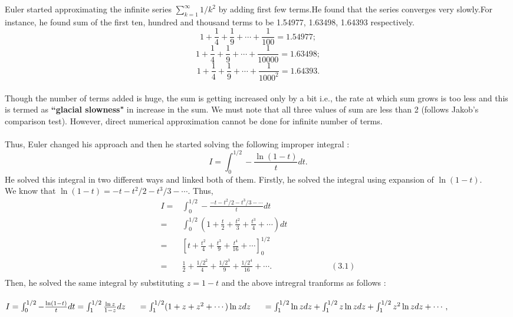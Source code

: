 \documentclass[a4paper,reqno,11pt]{amsart}
\theoremstyle{plain}%
\begin{document}
Euler started approximating the infinite series $\sum_{k=1}^{\infty}1/k^2$
by adding first few terms.He found that the series converges very slowly.For instance, he found sum of the first ten, hundred and thousand terms to be 
1.54977, 1.63498, 1.64393 respectively.\\
$$1 + \frac{1}{4} + \frac{1}{9} + \cdots + \frac{1}{100} = 1.54977;$$
$$1 + \frac{1}{4} + \frac{1}{9} + \cdots + \frac{1}{10000} = 1.63498;$$
$$1 + \frac{1}{4} + \frac{1}{9} + \cdots + \frac{1}{1000^2} = 1.64393.$$
\\
Though the number of terms added is huge, the sum is getting increased only by a bit i.e., the rate at which sum grows is too less and this is termed as \textbf{``glacial slowness"} in increase in the sum. We must note that all three values of sum are less than 2 (follows Jakob's comparison test). However, direct numerical approximation cannot be done for infinite number of terms.\\
\\
Thus, Euler changed his approach and then he started solving the following improper integral :\\
$$I = \int_{0}^{1/2} -\frac{\ln(1-t)}{t} dt.$$
He solved this integral in two different ways and linked both of them. Firstly, he solved the integral using expansion of $\ln(1-t).$\\
We know that $\ln(1-t) = -t -t^2/2 -t^3/3 - \cdots.$ Thus,\\
\begin{align*}
I =& \int_{0}^{1/2} -\frac{-t -t^2/2 -t^3/3 - \cdots}{t} dt\\
=& \int_{0}^{1/2} (1 + \frac{t}{2} + \frac{t^2}{3} + \frac{t^3}{4} + \cdots)dt\\
= & \left[t + \frac{t^2}{4} + \frac{t^3}{9} + \frac{t^4}{16} + \cdots\right]_0^{1/2}\\
= & \frac{1}{2} + \frac{1/2^2}{4} + \frac{1/2^3}{9} + \frac{1/2^4}{16} + \cdots. \hspace{3cm} (3.1)\\
\end{align*}
Then, he solved the same integral by substituting $z=1-t$ and the above intregral tranforms as follows :\\
\\
$I = \int_{0}^{1/2} -\frac{\ln(1-t)}{t} dt = \int_{1}^{1/2} \frac{\ln z}{1-z} dz \\
\\
\indent = \int_{1}^{1/2} (1 + z + z^2 +\cdots)\ln zdz\\
\indent = \int_{1}^{1/2}\ln zdz + \int_{1}^{1/2}z\ln zdz + \int_{1}^{1/2} z^2\ln zdz + \cdots,$\\
\end{document}
